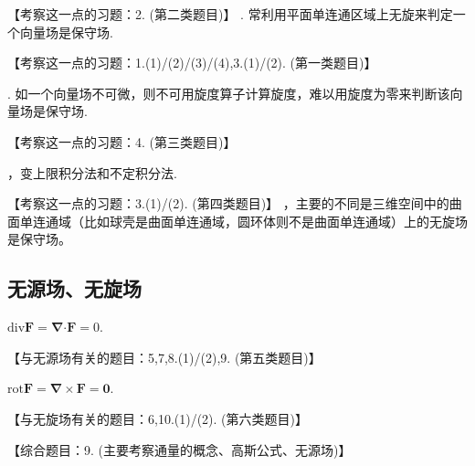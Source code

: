 \documentclass[12pt,UTF8]{ctexart}
\begin{document}
\begin{enumerate}
【考察这一点的习题：2. (第二类题目)】
. 常利用平面单连通区域上无旋来判定一个向量场是保守场.

【考察这一点的习题：1.(1)/(2)/(3)/(4),3.(1)/(2). (第一类题目)】

. 如一个向量场不可微，则不可用旋度算子计算旋度，难以用旋度为零来判断该向量场是保守场.

【考察这一点的习题：4. (第三类题目)】

，变上限积分法和不定积分法.

【考察这一点的习题：3.(1)/(2). (第四类题目)】
，主要的不同是三维空间中的曲面单连通域（比如球壳是曲面单连通域，圆环体则不是曲面单连通域）上的无旋场是保守场。
\end{enumerate}
\subsection{无源场、无旋场}
\begin{enumerate}
$\text{div}\bm F=\bm\nabla\bm\cdot\bm F=0$.

【与无源场有关的题目：5,7,8.(1)/(2),9. (第五类题目)】

$\text{rot}\bm F=\bm\nabla\times\bm F=\bm0$.

【与无旋场有关的题目：6,10.(1)/(2). (第六类题目)】

【综合题目：9. (主要考察通量的概念、高斯公式、无源场)】
\end{enumerate}
\end{document}
